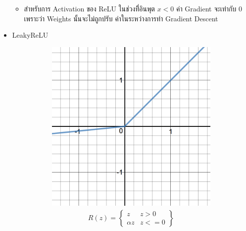 \begin{itemize}
\begin{itemize}
        \item สำหรับการ Activation ของ ReLU ในช่วงที่ิอินพุต $x < 0$ ค่า Gradient จะเท่ากับ 0 เพราะว่า Weights นั้นจะไม่ถูกปรับ%
        ค่าในระหว่างการทำ Gradient Descent
    \end{itemize}

    \item LeakyReLU
    \begin{figure}[H]
        \centering
        \begin{subfigure}{0.5\textwidth}
            \centering
            \includegraphics[width=0.9\linewidth]{fig/actfunc_leakyrelu.png}
            \caption{%
                \begin{equation}
                    \begin{split}R(z) = \begin{Bmatrix} z & z > 0 \\
                        \alpha z & z <= 0 \end{Bmatrix}\end{split}
                \end{equation}
            }
            \label{fig:actfunc_leakyrelu}
        \end{subfigure}%
        \begin{subfigure}{0.5\textwidth}
            \centering

\end{subfigure}
\end{figure}
\end{itemize}
